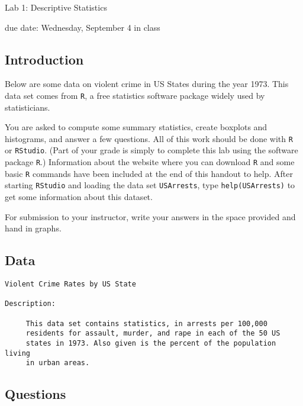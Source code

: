 \documentclass{report}
\begin{document}
{\bf \centerline{{\large Lab 1: Descriptive Statistics}}}

\centerline{due date: Wednesday, September 4 in class}

\bigskip

\subsection*{Introduction}

Below are some data on violent crime in US States during the year
1973. This data set comes from {\tt R}, a free statistics software package
widely used by statisticians.

You are asked to compute some summary statistics, create boxplots
and histograms, and answer a few questions.  All of this work should 
be done with {\tt R} or {\tt RStudio}.  (Part of your grade is simply to complete
this lab using the software package {\tt R}.)
Information about the website where you can download {\tt R} and some
basic {\tt R} commands have been included at the end of this handout to help.  
After starting {\tt RStudio} and loading the data set {\tt USArrests}, type
{\tt help(USArrests)} to get some information about this dataset.

For submission to your instructor, write your answers in the space provided 
and hand in graphs.

\subsection*{Data}

\begin{verbatim}
Violent Crime Rates by US State

Description:

     This data set contains statistics, in arrests per 100,000
     residents for assault, murder, and rape in each of the 50 US
     states in 1973. Also given is the percent of the population living
     in urban areas.
\end{verbatim}

\subsection*{Questions}
\end{document}
